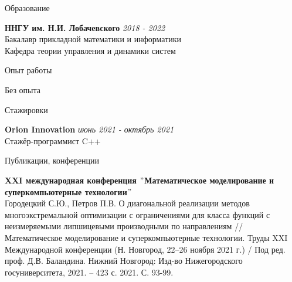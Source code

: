 \documentclass{resume} %
\begin{document}

\begin{rSection}{Образование}

{\bf ННГУ им. Н.И. Лобачевского} \hfill {\em 2018 - 2022} \\ 
Бакалавр прикладной математики и информатики \\
Кафедра теории управления и динамики систем

\end{rSection}


\begin{rSection}{Опыт работы}

Без опыта

\end{rSection}

\begin{rSection}{Стажировки}

{\bf Orion Innovation} \hfill {\em июнь 2021 - октябрь 2021} \\ 
Стажёр-программист C++

\end{rSection}

\begin{rSection}{Публикации, конференции}

{\bf XXI международная конференция $"$Математическое моделирование и суперкомпьютерные технологии$"$} \hfill {\em } \\ 
Городецкий С.Ю., Петров П.В. О диагональной реализации методов многоэкстремальной оптимизации с ограничениями для класса функций с неизмеряемыми липшицевыми производными по направлениям // Математическое моделирование и суперкомпьютерные технологии. Труды XXI Международной конференции (Н. Новгород, 22–26 ноября 2021 г.) / Под ред. проф. Д.В. Баландина. Нижний Новгород: Изд-во Нижегородского госуниверситета, 2021. – 423 с. 2021. С. 93-99.

\end{rSection}

\end{document}
